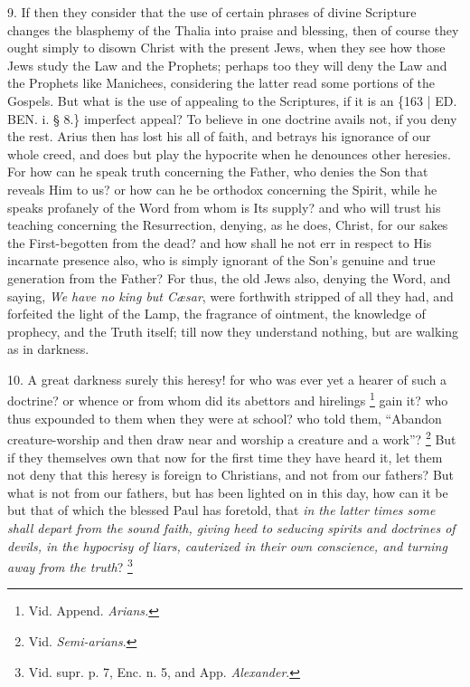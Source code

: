 9. If then they consider that
the use of certain phrases of divine Scripture changes the blasphemy
of the Thalia into praise and blessing, then of course they ought
simply to disown Christ with the present Jews, when they see how those
Jews study the Law and the Prophets; perhaps too they will deny the
Law and the Prophets like Manichees, considering the latter read some
portions of the Gospels. But what is the use of appealing to the
Scriptures, if it is an \{163 | ED.
BEN.
i. § 8.\} imperfect appeal? To believe in one doctrine avails not, if
you deny the rest. Arius then has lost his all of faith, and betrays
his ignorance of our whole creed, and does but play the hypocrite when
he denounces other heresies. For how can he speak truth concerning the
Father, who denies the Son that reveals Him to us? or how can he be
orthodox concerning the Spirit, while he speaks profanely of the Word
from whom is Its supply? and who will trust his teaching concerning
the Resurrection, denying, as he does, Christ, for our sakes the
First-begotten from the dead? and how shall he not err in respect to
His incarnate presence also, who is simply ignorant of the Son's
genuine and true generation from the Father? For thus, the old Jews
also, denying the Word, and saying, \emph{We have no king but Cæsar},
were forthwith stripped of all they had, and forfeited the light of
the Lamp, the fragrance of ointment, the knowledge of prophecy, and
the Truth itself; till now they understand nothing, but are walking as
in darkness.

10. A great darkness surely
this heresy! for who was ever yet a hearer of such a doctrine? or
whence or from whom did its abettors and hirelings \footnote{Vid. Append. \emph{Arians.}} gain it? who thus expounded to them when they were at school?
who told them, ``Abandon creature-worship and then draw near and
worship a creature and a work''? \footnote{Vid. \emph{Semi-arians}.} But if they themselves own that now for the first time they
have heard it, let them not deny that this heresy is foreign to
Christians, and not from our fathers? But what is not from our
fathers, but has been lighted on in this day, how can it be but that
of which the blessed Paul has foretold, that \emph{in the latter times
some shall depart from the sound faith, giving heed to seducing
spirits and doctrines of devils, in the hypocrisy of liars, cauterized
in their own conscience, and turning away from the truth}? \footnote{Vid. supr. p. 7, Enc. n. 5, and App. \emph{Alexander}.}

